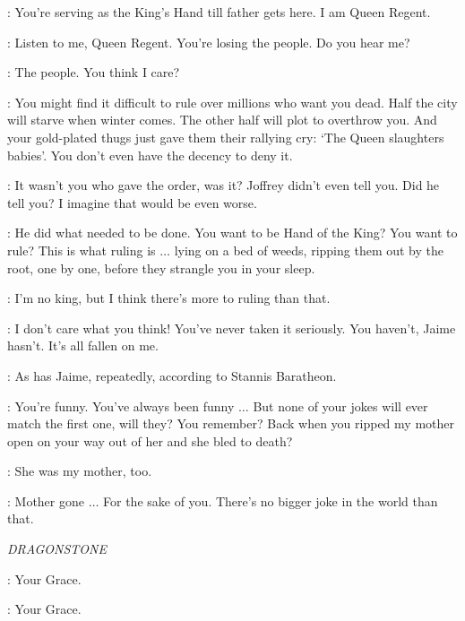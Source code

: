 \CERSEI: You're serving as the King's Hand till father gets here. I am Queen Regent.

\TYRION: Listen to me, Queen Regent. You're losing the people. Do you hear me?


\CERSEI: The people. You think I care?

\TYRION: You might find it difficult to rule over millions who want you dead. Half the city will starve when winter comes. The other half will plot to overthrow you. And your gold-plated thugs just gave them their rallying cry: `The Queen slaughters babies'. You don't even have the decency to deny it.


\TYRION: It wasn't you who gave the order, was it? Joffrey didn't even tell you. Did he tell you? I imagine that would be even worse.

\CERSEI: He did what needed to be done. You want to be Hand of the King? You want to rule? This is what ruling is $\ldots$ lying on a bed of weeds, ripping them out by the root, one by one, before they strangle you in your sleep.

\TYRION: I'm no king, but I think there's more to ruling than that.

\CERSEI: I don't care what you think! You've never taken it seriously. You haven't, Jaime hasn't. It's all fallen on me.

\TYRION: As has Jaime, repeatedly, according to Stannis Baratheon.

\CERSEI: You're funny. You've always been funny $\ldots$ But none of your jokes will ever match the first one, will they? You remember? Back when you ripped my mother open on your way out of her and she bled to death?

\TYRION: She was my mother, too.

\CERSEI: Mother gone $\ldots$ For the sake of you. There's no bigger joke in the world than that.



\scene

\textit{DRAGONSTONE}


\DAVOS: Your Grace.

\MATTHOS: Your Grace.

